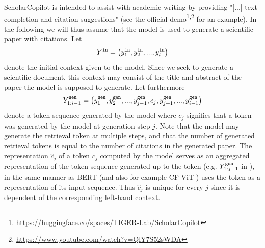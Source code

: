 ScholarCopilot is intended to assist with academic writing by providing "[...] text completion and citation suggestions" (see the official demo\footnote{\url{https://huggingface.co/spaces/TIGER-Lab/ScholarCopilot}}\textsuperscript{,}\footnote{\url{https://www.youtube.com/watch?v=QlY7S52sWDA}} for an example). In the following we will thus assume that the model is used to generate a scientific paper with citations. Let
\begin{align}\label{eq:initial-context}
    Y^{\texttt{in}}=\left({y^{\texttt{in}}_1,y^{\texttt{in}}_2,...,y^{\texttt{in}}_l}\right)
\end{align}
denote the initial context given to the model. Since we seek to generate a scientific document, this context may consist of the title and abstract of the paper the model is supposed to generate. Let furthermore 
\begin{align}\label{eq:generated-tokens}
    Y^{\texttt{gen}}_{1:i-1}=\left({y^{\texttt{gen}}_{1},y^{\texttt{gen}}_{2},...,y^{\texttt{gen}}_{j-1},c_j,y^{\texttt{gen}}_{j+1},...,y^{\texttt{gen}}_{i-1}}\right)
\end{align}
denote a token sequence generated by the model where $c_j$ signifies that a \mono{[RET]} token was generated by the model at generation step $j$. Note that the model may generate the retrieval token at multiple steps, and that the number of generated retrieval tokens is equal to the number of citations in the generated paper. The representation $\hat{c}_j$ of a \mono{[RET]} token $c_j$ computed by the model serves as an aggregated representation of the token sequence generated up to the \mono{[RET]} token (e.g. $Y^{\texttt{gen}}_{1:j-1}$ in ), in the same manner as BERT \cite{devlin2019bert} (and also for example CF-ViT \cite{chen2023cf}) uses the \mono{[cls]} token as a representation of its input sequence. Thus $\hat{c}_j$ is unique for every $j$ since it is dependent of the corresponding left-hand context. 

